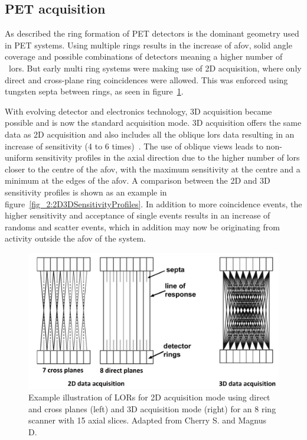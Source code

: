 \subsection{PET acquisition}
As described the ring formation of PET detectors is the dominant geometry used in PET systems. Using multiple rings results in the increase of \gls{afov}, solid angle coverage and possible combinations of detectors meaning a higher number of ~\glspl{lor}. But early multi ring systems were making use of 2D acquisition, where only direct and cross-plane ring coincidences were allowed. This was enforced using tungsten septa between rings, as seen in figure~\ref{fig_2:2D3D}. %

With evolving detector and electronics technology, 3D acquisition became possible and is now the standard acquisition mode. 3D acquisition offers the same data as 2D acquisition and also includes all the oblique \glspl{lor} data resulting in an increase of sensitivity (4 to 6 times)~\cite{Fahey2002}. The use of oblique views leads to non-uniform sensitivity profiles in the axial direction due to the higher number of \glspl{lor} closer to the centre of the \gls{afov}, with the maximum sensitivity at the centre and a minimum at the edges of the \gls{afov}. A comparison between the 2D and 3D sensitivity profiles is shown as an example in figure~\ref{fig_2:2D3DSensitivityProfiles}.
In addition to more coincidence events, the higher sensitivity and acceptance of single events results in an increase of randoms and scatter events, which in addition may now be originating from activity outside the \gls{afov} of the system. 
%
\begin{figure} [h!]
\centering
\includegraphics[scale=0.40,angle=0]{2_Theory_Methods/figures/Phelps_2D_3D_Acquisition.pdf}
\caption{Example illustration of LORs for 2D acquisition mode using direct and cross planes (left) and 3D  acquisition mode (right) for an 8 ring scanner with 15 axial slices. Adapted from Cherry S. and Magnus D.~\cite{cherry2004pet}} 
\label{fig_2:2D3D}
\end{figure} 

